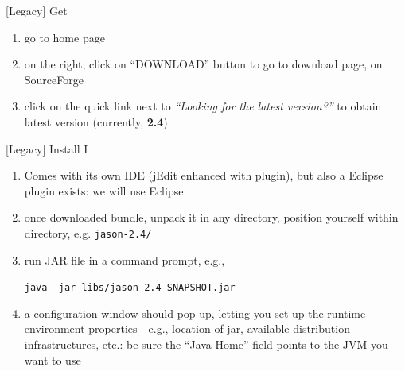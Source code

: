\documentclass[presentation]{beamer}\mode<presentation>{\usetheme{AMSBolognaFC}}
\begin{document}
\begin{frame}[c]{[Legacy] Get \jason{}}
    \begin{enumerate}
        \item go to \jason{} home page
        \begin{center}
        \end{center}
    
        \vfill
    
        \item on the right, click on ``DOWNLOAD'' button to go to \jason{} download page, on SourceForge
        \begin{center}
        \end{center}
        
        \vfill
        
        \item click on the quick link next to \emph{``Looking for the latest version?''} to obtain \jason{} latest version (currently, \textbf{2.4})
    \end{enumerate}
\end{frame}

\begin{frame}[c]{[Legacy] Install \jason{} I}
    \begin{enumerate}
        \item \jason{} Comes with its own IDE (jEdit enhanced with \jason{} plugin), but also a Eclipse plugin exists: we will use Eclipse
        
        \vfill
        
        \item once downloaded \jason{} bundle, unpack it in any directory, position yourself within \jason{} directory, e.g. \texttt{jason-2.4/}
        
        \vfill
        
        \item run \jason{} JAR file in a command prompt, e.g., 
        \begin{center}
            \alert{\texttt{java -jar libs/jason-2.4-SNAPSHOT.jar}}
        \end{center}
        
        \vfill
        
        \item a configuration window should pop-up, letting you set up the \jason{} runtime environment properties---e.g., location of \jason{} jar, available distribution infrastructures, etc.: be sure the ``Java Home'' field points to the JVM you want to use
        
    \end{enumerate}
        
\end{frame}
\end{document}
